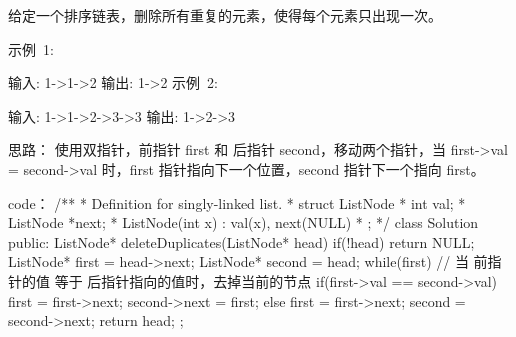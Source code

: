 给定一个排序链表，删除所有重复的元素，使得每个元素只出现一次。

示例 1:

输入: 1->1->2
输出: 1->2
示例 2:

输入: 1->1->2->3->3
输出: 1->2->3



























思路：
使用双指针，前指针 first 和 后指针 second，移动两个指针，当 first->val = second->val 时，first 指针指向下一个位置，second 指针下一个指向 first。



























code：
/**
 * Definition for singly-linked list.
 * struct ListNode {
 *     int val;
 *     ListNode *next;
 *     ListNode(int x) : val(x), next(NULL) {}
 * };
 */
class Solution {
public:
    ListNode* deleteDuplicates(ListNode* head) {
        if(!head) return NULL;
        ListNode* first = head->next;
        ListNode* second = head;
        while(first)
        {
            // 当 前指针的值 等于 后指针指向的值时，去掉当前的节点
            if(first->val == second->val)
            {
                first = first->next;
                second->next = first;
            }
            else
            {
                first = first->next;
                second = second->next;
            }
        }
        return head;
    }
};